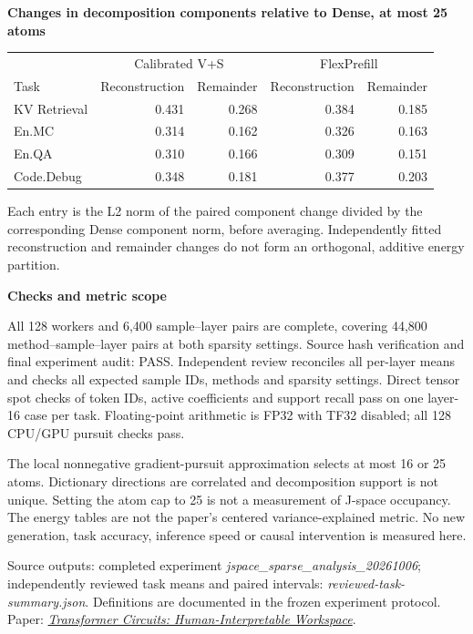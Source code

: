 \documentclass[10pt]{article}
\begin{document}
\textbf{Changes in decomposition components relative to Dense, at most 25 atoms}
\begin{center}\begin{tabular}{lrrrr}\toprule
& \multicolumn{2}{c}{Calibrated V+S} & \multicolumn{2}{c}{FlexPrefill}\\
Task & Reconstruction & Remainder & Reconstruction & Remainder\\\midrule
KV Retrieval & 0.431 & 0.268 & 0.384 & 0.185 \\
En.MC & 0.314 & 0.162 & 0.326 & 0.163 \\
En.QA & 0.310 & 0.166 & 0.309 & 0.151 \\
Code.Debug & 0.348 & 0.181 & 0.377 & 0.203 \\
\bottomrule\end{tabular}\end{center}
Each entry is the L2 norm of the paired component change divided by the corresponding Dense component norm, before averaging. Independently fitted reconstruction and remainder changes do not form an orthogonal, additive energy partition.

\textbf{Checks and metric scope}

All 128 workers and 6,400 sample--layer pairs are complete, covering 44,800 method--sample--layer pairs at both sparsity settings. Source hash verification and final experiment audit: PASS. Independent review reconciles all per-layer means and checks all expected sample IDs, methods and sparsity settings. Direct tensor spot checks of token IDs, active coefficients and support recall pass on one layer-16 case per task. Floating-point arithmetic is FP32 with TF32 disabled; all 128 CPU/GPU pursuit checks pass.

The local nonnegative gradient-pursuit approximation selects at most 16 or 25 atoms. Dictionary directions are correlated and decomposition support is not unique. Setting the atom cap to 25 is not a measurement of J-space occupancy. The energy tables are not the paper's centered variance-explained metric. No new generation, task accuracy, inference speed or causal intervention is measured here.

Source outputs: completed experiment \textit{jspace\_sparse\_analysis\_20261006}; independently reviewed task means and paired intervals: \textit{reviewed-task-summary.json}. Definitions are documented in the frozen experiment protocol. Paper: \href{https://transformer-circuits.pub/2026/workspace/index.html}{\textit{Transformer Circuits: Human-Interpretable Workspace}}.
\end{document}
